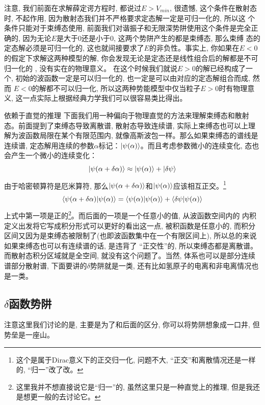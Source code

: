 \documentclass[a4paper,zihao=-4,linespread=1]{ctexrep}
\begin{document}
    注意, 我们前面在求解薛定谔方程时, 都说过$E>V_{min}$, 很遗憾, 这个条件在散射态时, 不起作用, 因为散射态我们并不严格要求定态解一定是可归一化的, 所以这
    个条件只能对于束缚态使用, 前面我们对谐振子和无限深势阱使用这个条件是完全正确的, 因为无论$E$是大于$0$还是小于$0$, 这两个势阱产生的都是束缚态, 那么束缚
    态的定态解必须是可归一化的, 这也就间接要求了$E$的非负性。事实上, 你如果在$E<0$的假定下求解这两种模型的解, 你会发现无论是定态还是线性组合后的解都是不可归一化的
    , 没有实在的物理意义。 在这个时候我们就说$E>0$的解已经构成了一个, 初始的波函数一定是可以归一化的, 也一定是可以由对应的定态解组合而成, 然而
    $E<0$的解都不可以归一化, 所以这两种势能模型中仅当粒子$E>0$时有物理意义, 这一点实际上根据经典力学我们可以很容易类比得出。
    \begin{history}{依赖于直觉的推理}
        下面我们用一种偏向于物理直觉的方法来理解束缚态和散射态。前面提到了束缚态导致离散谱, 散射态导致连续谱, 实际上束缚态也可以上理解为波函数局限在某个有限范围内,
        就像高斯波包一样。那么如果束缚态的谱线是连续谱, 定态解用连续的参数$\alpha$标记：$\ket{\psi(\alpha)}$。而且考虑参数微小的连续变化, 态也会产生一个微小的连续变化：
        \[\ket{\psi(\alpha+\delta\alpha)}\approx\ket{\psi(\alpha)}+\ket{\delta\psi}\]
        由于哈密顿算符是厄米算符, 那么$\ket{\psi(\alpha+\delta\alpha)}$和$\ket{\psi(\alpha)}$应该相互正交。\footnote{这个是属于Dirac意义下的正交归一化, 问题不大, “正交”和离散情况还是一样的, “归一”改了改。}
        \[
            \braket{\psi(\alpha+\delta\alpha)|\psi(\alpha)}=\braket{\psi(\alpha)|\psi(\alpha)}+\braket{\delta\psi|\psi(\alpha)}
        \]
        上式中第一项是正的\footnote{这里我并不想直接说它是“归一”的, 虽然这里只是一种直觉上的推理, 但是我还是想更一般的去讨论它。}。而后面的一项是一个任意小的值, 从波函数空间内的
        内积定义出发将它写成积分形式可以更好的看出这一点, 被积函数是任意小的, 而积分区间又因为是束缚态被限制了(也即波函数集中在一个有限区间上), 所以总的来说如果束缚态也可以有连续谱的话, 是违背了
        “正交性”的, 所以束缚态都是离散谱。而散射态积分区域就是全空间, 就没有这个问题了。当然, 体系也可以是部分连续谱部分散射谱, 下面要讲的$\delta$势阱就是一类, 还有比如氢原子的电离和非电离情况也是一类。
    \end{history}
    \subsection{\texorpdfstring{$\delta$}d函数势阱}
    注意这里我们讨论的是, 主要是为了和后面的区分, 你可以将势阱想象成一口井, 但势垒是一座山。
\end{document}
